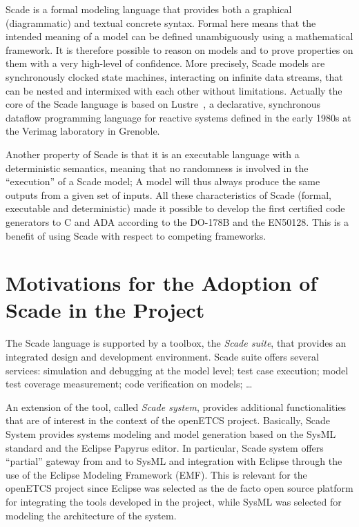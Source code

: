 \documentclass{template/openetcs_report}
\begin{document}
Scade is a formal modeling language that provides both a graphical
(diagrammatic) and textual concrete syntax. Formal here means that the
intended meaning of a model can be defined unambiguously using a
mathematical framework. It is therefore possible to reason on models
and to prove properties on them with a very high-level of
confidence. More precisely, Scade models are synchronously clocked
state machines, interacting on infinite data streams, that can be
nested and intermixed with each other without limitations. Actually
the core of the Scade language is based on
Lustre~\cite{al91,halbwachs05}, a declarative, synchronous dataflow
programming language for reactive systems defined in the early 1980s
at the Verimag laboratory in Grenoble.

Another property of Scade is that it is an executable language with a
deterministic semantics, meaning that no randomness is involved in the
``execution'' of a Scade model; A model will thus always produce the
same outputs from a given set of inputs.  All these characteristics of
Scade (formal, executable and deterministic) made it possible to
develop the first certified code generators to C and ADA according to
the DO-178B and the EN50128. This is a benefit of using Scade with
respect to competing frameworks.


\section{Motivations for the Adoption of Scade in the Project}

The Scade language is supported by a toolbox, the \emph{Scade suite},
that provides an integrated design and development environment. Scade
suite offers several services: simulation and debugging at the model
level; test case execution; model test coverage measurement; code
verification on models; \dots 

An extension of the tool, called \emph{Scade system}, provides
additional functionalities that are of interest in the context of the
openETCS project. Basically, Scade System provides systems modeling
and model generation based on the SysML standard and the Eclipse
Papyrus editor. In particular, Scade system offers ``partial'' gateway
from and to SysML and integration with Eclipse through the use of the
Eclipse Modeling Framework (EMF). This is relevant for the openETCS
project since Eclipse was selected as the de facto open source
platform for integrating the tools developed in the project, while
SysML was selected for modeling the architecture of the
system. 
\end{document}
